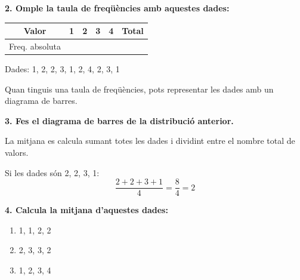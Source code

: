 \documentclass[12pt,a4paper]{article}
\begin{document}
\textbf{2. Omple la taula de freqüències amb aquestes dades:}

\begin{center}
\begin{tabular}{|c|c|c|c|c|c|}
\hline
\rowcolor{cyan!20}
Valor & 1 & 2 & 3 & 4 & Total \\ \hline
Freq. absoluta &  &  &  &  &  \\ \hline
\end{tabular}
\end{center}

Dades: 1, 2, 2, 3, 1, 2, 4, 2, 3, 1

\begin{capsula}
Quan tinguis una taula de freqüències, pots representar les dades amb un diagrama de barres.
\end{capsula}

\textbf{3. Fes el diagrama de barres de la distribució anterior.}

\begin{center}
\end{center}

\begin{capsula}
La mitjana es calcula sumant totes les dades i dividint entre el nombre total de valors.
\end{capsula}

\begin{exemple}
Si les dades són 2, 2, 3, 1:
\[
\frac{2+2+3+1}{4}=\frac{8}{4}=2
\]
\end{exemple}

\textbf{4. Calcula la mitjana d'aquestes dades:}

\begin{enumerate}[label=\alph*)]
    \item 1, 1, 2, 2 \vspace{0.7cm}
    \item 2, 3, 3, 2 \vspace{0.7cm}
    \item 1, 2, 3, 4 \vspace{0.7cm}
\end{enumerate}
\end{document}
